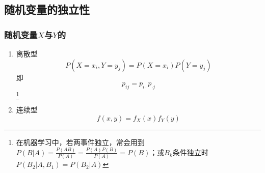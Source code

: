 \subsection{随机变量的独立性}
\subsubsection{随机变量$X$与$Y${\color{red}{相互独立}}的{\color{red}{充要条件}}}
\begin{enumerate}
	\item 离散型
	\begin{equation}
		P(X=x_i, Y=y_j) = P(X=x_i)P(Y=y_j)
	\end{equation}
	即
	\begin{equation}
		p_{ij} = p_{i\cdot} p_{\cdot j}
	\end{equation}
	\footnote{在机器学习中，若两事件独立，常会用到$P(B|A)=\frac{P(AB)}{P(A)}=\frac{P(A)P(B)}{P(A)}=P(B)$；或$B_k$条件独立时$P(B_2|A, B_1) = P(B_2|A)$}

	\item 连续型
	\begin{equation}
		f(x, y) = f_X(x)f_Y(y)
	\end{equation}
	
\end{enumerate}



